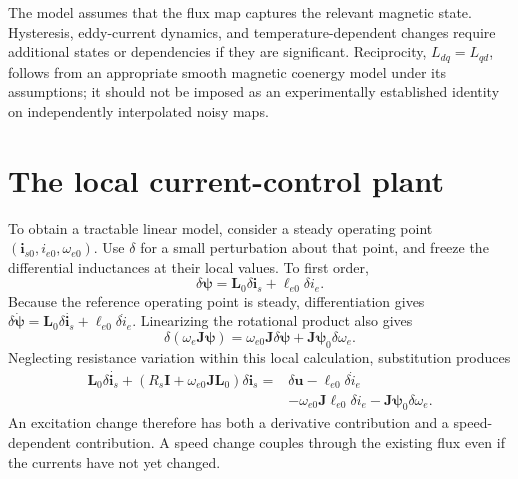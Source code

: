The model assumes that the flux map captures the relevant magnetic state. Hysteresis, eddy-current dynamics, and temperature-dependent changes require additional states or dependencies if they are significant. Reciprocity, $L_{dq}=L_{qd}$, follows from an appropriate smooth magnetic coenergy model under its assumptions; it should not be imposed as an experimentally established identity on independently interpolated noisy maps.

\section{The local current-control plant}

To obtain a tractable linear model, consider a steady operating point $(\bm i_{s0},i_{e0},\omega_{e0})$. Use $\delta$ for a small perturbation about that point, and freeze the differential inductances at their local values. To first order,
\begin{equation}
 \delta\bm\psi=\bm L_0\delta\bm i_s+
                         \bm\ell_{e0}\delta i_e.
\end{equation}
Because the reference operating point is steady, differentiation gives $\delta\dot{\bm\psi}=\bm L_0\delta\dot{\bm i_s}+\bm\ell_{e0}\delta\dot i_e$. Linearizing the rotational product also gives
\begin{equation}
 \delta(\omega_e\bm J\bm\psi)
 =\omega_{e0}\bm J\delta\bm\psi
   +\bm J\bm\psi_0\delta\omega_e.
\end{equation}
Neglecting resistance variation within this local calculation, substitution produces
\begin{align}
 \bm L_0\delta\dot{\bm i_s}
 +(R_s\bm I+\omega_{e0}\bm J\bm L_0)\delta\bm i_s
 ={}&\delta\bm u-\bm\ell_{e0}\delta\dot i_e\nonumber\\
 &-\omega_{e0}\bm J\bm\ell_{e0}\delta i_e
 -\bm J\bm\psi_0\delta\omega_e.
 \label{eq:control-local-state}
\end{align}
An excitation change therefore has both a derivative contribution and a speed-dependent contribution. A speed change couples through the existing flux even if the currents have not yet changed.

